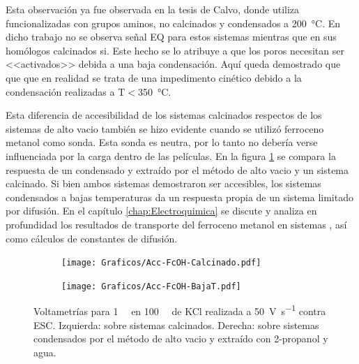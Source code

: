       Esta observación ya fue observada en la tesis de Calvo\cite{Calvo20210}, donde utiliza \pdmF\space funcionalizadas con grupos aminos, no calcinados y condensados a \SI{200}{\celsius}. En dicho trabajo no se observa señal EQ para estos sistemas mientras que en sus homólogos calcinados si. Este hecho se lo atribuye a que los poros necesitan ser <<activados>> debida a una baja condensación. Aquí queda demostrado que que que en realidad se trata de una impedimento cinético debido a la condensación realizadas a T$<$\SI{350}{\celsius}.

      Esta diferencia de accesibilidad de los sistemas calcinados respectos de los sistemas de alto vacio también se hizo evidente cuando se utilizó ferroceno metanol como sonda. Esta sonda es neutra, por lo tanto no debería verse influenciada por la carga dentro de las películas. En la figura \ref{fig:fcOH_accesibilidad} se compara la respuesta de un \pdmF\space condensado y extraído por el método de alto vacio y un sistema \pdmF\space calcinado. Si bien ambos sistemas demostraron ser accesibles, los sistemas condensados a bajas temperaturas da un respuesta propia de un sistema limitado por difusión. En el capítulo \ref{chap:Electroquimica} se discute y analiza en profundidad  los resultados de transporte del ferroceno metanol en sistemas \pdmF, así como cálculos de constantes de difusión.

      		\begin{figure}[ht!]
		 	\begin{subfigure}[t]{0.5\textwidth}
		          	\texttt{[image: Graficos/Acc-FcOH-Calcinado.pdf]}
		          	\end{subfigure}
		    \begin{subfigure}[t]{0.5\textwidth}
		          	\texttt{[image: Graficos/Acc-FcOH-BajaT.pdf]}
		         	\end{subfigure}
		         	\caption[Voltagrama comparativo SF calcinados/alto vacío II]{Voltametrías para \fc\space \SI{1}{\milli\Molar} en \SI{100}{\milli\Molar} de KCl realizada a \SI{50}{\volt\per\second} contra ESC. Izquierda: sobre sistemas \pdmF\space calcinados. Derecha: sobre sistemas \pdmF\space condensados por el método de alto vacio y extraído con 2-propanol y agua.}
		         	\label{fig:fcOH_accesibilidad}
		    \end{figure}     	

